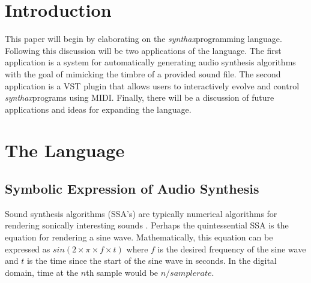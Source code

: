 \documentclass[12pt]{article}
\newcommand{\audiolanguagenamelower}{\emph{synthax}}
\begin{document}
\maketitle

\begin{abstract}
This paper presents a novel method of digital audio synthesis using Lisp-like symbolic expressions. The developed system is an audio programming language called ``\audiolanguagenamelower'' where valid programs directly represent algorithms for audio synthesis. The symbolic expression representation is convenient from a computational standpoint as it is recursively defined and highly parallelizable. The structures can be created and manipulated through genetic programming allowing users to search for synthesis algorithms that mimic acoustic and electronic timbres. It is also possible for users to search for desirable timbres using an interactive genetic algorithm where timbres can be auditioned in real-time using MIDI.
\end{abstract}



\section{Introduction}\label{TOPINTRO}
This paper will begin by elaborating on the \audiolanguagenamelower programming language. Following this discussion will be two applications of the language. The first application is a system for automatically generating audio synthesis algorithms with the goal of mimicking the timbre of a provided sound file. The second application is a VST plugin that allows users to interactively evolve and control \audiolanguagenamelower programs using MIDI. Finally, there will be a discussion of future applications and ideas for expanding the language.



\section{The Language}

\subsection{Symbolic Expression of Audio Synthesis}\label{SEXPRESSION}

Sound synthesis algorithms (SSA's) are typically numerical algorithms for rendering sonically interesting sounds \citep{tolonen1998evaluation}. Perhaps the quintessential SSA is the equation for rendering a sine wave. Mathematically, this equation can be expressed as $sin (2 \times \pi \times f \times t)$ where $f$ is the desired frequency of the sine wave and $t$ is the time since the start of the sine wave in seconds. In the digital domain, time at the $n$th sample would be $n/sample rate$.
	
\end{document}
